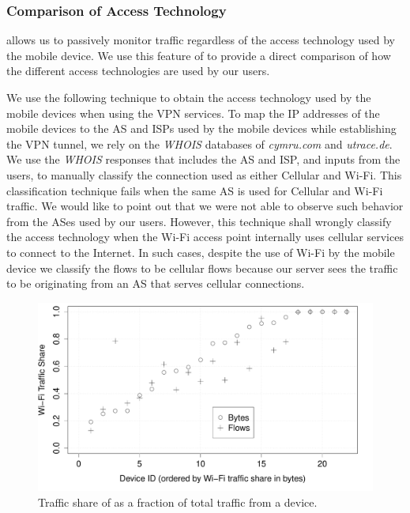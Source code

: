 \subsubsection{Comparison of Access Technology}
\platname allows us to passively monitor traffic regardless of the access technology used by the mobile device. 
We use this feature of \platname to provide a direct comparison of how the different access technologies are used by our users. 

We use the following technique to obtain the access technology used by the mobile devices when using the VPN services. 
To map the IP addresses of the mobile devices to the AS and ISPs used by the mobile devices while establishing the VPN tunnel, we rely on the \emph{WHOIS} databases of \emph{cymru.com} and \emph{utrace.de}. 
We use the \emph{WHOIS} responses that includes the AS and ISP, and inputs from the users, to manually classify the connection used as either Cellular and Wi-Fi. 
This classification technique fails when the same AS is used for Cellular and Wi-Fi traffic.
We would like to point out that we were not able to observe such behavior from the ASes used by our users. 
However, this technique shall wrongly classify the access technology when the Wi-Fi access point internally uses cellular services to connect to the Internet. 
In such cases, despite the use of Wi-Fi by the mobile device we classify the flows to be cellular flows because our server sees the traffic to be originating from an AS that serves cellular connections.

\begin{figure}
\includegraphics[width=\columnwidth]{plots/deviceTechShare.pdf}
\caption{Traffic share of \wifi as a fraction of total traffic from a device. }
\label{fig:devicetechshare}
\end{figure}

